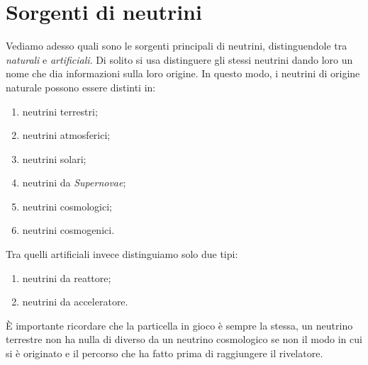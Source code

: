     \section{Sorgenti di neutrini}
        Vediamo adesso quali sono le sorgenti principali di neutrini, distinguendole tra \emph{naturali} e \emph{artificiali}. Di solito si usa distinguere gli stessi neutrini dando loro un nome che dia informazioni sulla loro origine. In questo modo, i neutrini di origine naturale possono essere distinti in:
        \begin{enumerate}[label = $\star$]
            \item neutrini terrestri;
            \item neutrini atmosferici;
            \item neutrini solari;
            \item neutrini da \textit{Supernovae};
            \item neutrini cosmologici;
            \item neutrini cosmogenici.
        \end{enumerate}
        Tra quelli artificiali invece distinguiamo solo due tipi:
        \begin{enumerate}[label = $\star$]
            \item neutrini da reattore;
            \item neutrini da acceleratore.
        \end{enumerate}
        È importante ricordare che la particella in gioco è sempre la stessa, un neutrino terrestre non ha nulla di diverso da un neutrino cosmologico se non il modo in cui si è originato e il percorso che ha fatto prima di raggiungere il rivelatore.

